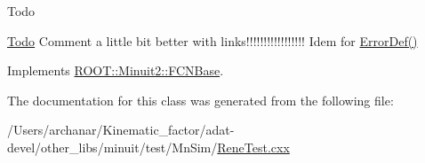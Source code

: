 \begin{DoxyRefDesc}{Todo}
\item[\mbox{\hyperlink{todo__todo000001}{Todo}}]Comment a little bit better with links!!!!!!!!!!!!!!!!! Idem for \mbox{\hyperlink{classROOT_1_1Minuit2_1_1FCNBase_ac4592475c58a65b037ba97ab5f3cba10}{Error\+Def()}}\end{DoxyRefDesc}


Implements \mbox{\hyperlink{classROOT_1_1Minuit2_1_1FCNBase_a04ef08ddad92ce8d89d498efbe021c39}{R\+O\+O\+T\+::\+Minuit2\+::\+F\+C\+N\+Base}}.



The documentation for this class was generated from the following file\+:\begin{DoxyCompactItemize}
\item 
/\+Users/archanar/\+Kinematic\+\_\+factor/adat-\/devel/other\+\_\+libs/minuit/test/\+Mn\+Sim/\mbox{\hyperlink{adat-devel_2other__libs_2minuit_2test_2MnSim_2ReneTest_8cxx}{Rene\+Test.\+cxx}}\end{DoxyCompactItemize}
